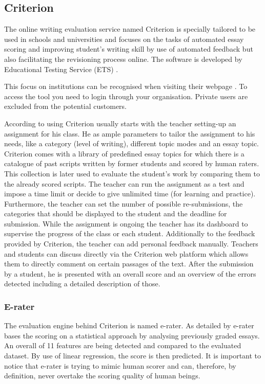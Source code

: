 \documentclass[runningheads]{llncs}
\let\OldTextregistered\textregistered
\renewcommand{\textregistered}{\OldTextregistered\xspace}
\begin{document}
\subsection{Criterion\textregistered}
The online writing evaluation service named Criterion\textregistered is specially tailored to be used in schools and universities and focuses on the tasks of automated essay scoring and improving student's writing skill by use of automated feedback but also facilitating the revisioning process online. The software is developed by Educational Testing Service (ETS) \citep{noauthor_ets_nodate}.

This focus on institutions can be recognised when visiting their webpage \citep{noauthor_ets_nodate}. To access the tool you need to login through your organisation. Private users are excluded from the potential customers. 

According to \textcite{lim_review_2012} using Criterion\textregistered usually starts with the teacher setting-up an assignment for his class. He as ample parameters to tailor the assignment to his needs, like a category (level of writing), different topic modes and an essay topic. Criterion\textregistered comes with a library of predefined essay topics for which there is a catalogue of past scripts written by former students and scored by human raters. This collection is later used to evaluate the student's work by comparing them to the already scored scripts. The teacher can run the assignment as a test and impose a time limit or decide to give unlimited time (for learning and practice). Furthermore, the teacher can set the number of possible re-submissions, the categories that should be displayed to the student and the deadline for submission. While the assignment is ongoing the teacher has its dashboard to supervise the progress of the class or each student. Additionally to the feedback provided by Criterion\textregistered, the teacher can add personal feedback manually. Teachers and students can discuss directly via the Criterion\textregistered web platform which allows them to directly comment on certain passages of the text. After the submission by a student, he is presented with an overall score and an overview of the errors detected including a detailed description of those.

\subsubsection{E-rater}
The evaluation engine behind Criterion\textregistered is named e-rater\textregistered. As detailed by \textcite{lim_review_2012} e-rater\textregistered bases the scoring on a statistical approach by analysing previously graded essays. An overall of 11 features are being detected and compared to the evaluated dataset. By use of linear regression, the score is then predicted. It is important to notice that e-rater\textregistered is trying to mimic human scorer and can, therefore, by definition, never overtake the scoring quality of human beings. 
\end{document}
